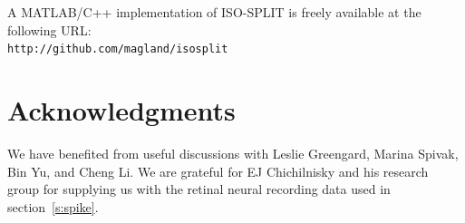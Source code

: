 \documentclass[10pt]{article}
\begin{document}
A MATLAB/C++ implementation of ISO-SPLIT is freely available
at the following URL:\\
{\tt http://github.com/magland/isosplit}

\section*{Acknowledgments}

We have benefited from useful discussions with Leslie Greengard,
Marina Spivak, Bin Yu, and Cheng Li.
We are grateful for EJ Chichilnisky and his research group
for supplying us with the retinal neural recording data used
in section~\ref{s:spike}.

\appendix %


\end{document}
